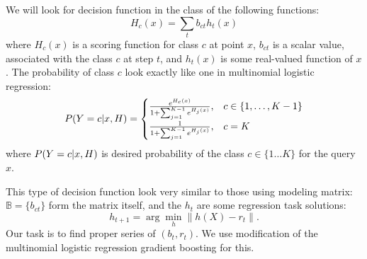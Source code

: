\documentclass{article}
\begin{document}
We will look for decision function in the class of the following functions:
\begin{equation}
H_c(x) = \sum_t b_{ct} h_t(x) 
\end{equation}
where $H_c(x)$ is a scoring function for class $c$ at point $x$, $b_{ct}$ is a scalar value, associated with the class $c$ at step $t$, and $h_t(x)$ is some real-valued function of $x$. The probability of class $c$ look exactly like one in multinomial logistic regression:
\begin{equation}
  P(Y = c \arrowvert x, H) =
  \begin{cases}
    \frac{ e^{H_{c}(x)} }
       { 1+\sum_{j=1}^{K-1} e^{H_{j}(x)} }
    , & c \in \{1, \ldots, K-1 \} \\

    \frac{ 1 }
       { 1 + \sum_{j=1}^{K-1} e^{H_{j}(x)} }
    , & c=K
  \end{cases}\label{eq:MLR_model}
\end{equation}
where $P(Y = c \arrowvert x, H)$ is desired probability of the class $c \in \{1\ldots K\}$ for the query $x$.

This type of decision function look very similar to those using modeling matrix: $\mathbb{B} = \{b_{ct}\}$ form the matrix itself, and the $h_t$ are some regression task solutions:
\begin{equation}
h_{t+1} = \arg \min_h \|h(X) - r_t\|.
\end{equation}
Our task is to find proper series of $(b_t, r_t)$. We use modification of the multinomial logistic regression gradient boosting for this.
\end{document}
